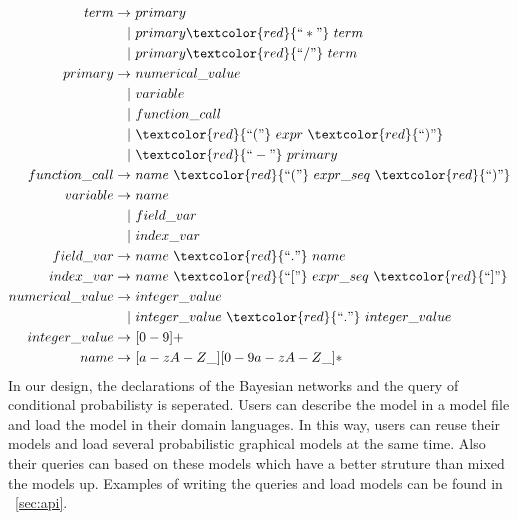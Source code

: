 \begin{align*}             
             term \rightarrow & ~primary \\  
                   |& ~primary \textcolor{red}{``*"} ~term \\
                   |& ~primary \textcolor{red}{``/"} ~term \\
          primary \rightarrow & ~numerical\_value \\
                   |& ~variable \\
                   |& ~function\_call \\
                   |& ~\textcolor{red}{``("} ~expr ~\textcolor{red}{``)"} \\
                   |& ~\textcolor{red}{``-"} ~primary \\           
    function\_call \rightarrow & ~name ~\textcolor{red}{``("} ~expr\_seq ~\textcolor{red}{``)"} \\           
         variable \rightarrow & ~name \\
                   |& ~field\_var \\
                   |& ~index\_var \\              
        field\_var \rightarrow & ~name ~\textcolor{red}{``."} ~name \\
        index\_var \rightarrow & ~name ~\textcolor{red}{``["} ~expr\_seq ~\textcolor{red}{``]"} \\           
  numerical\_value \rightarrow & ~integer\_value \\
                   |& ~integer\_value ~\textcolor{red}{``."} ~integer\_value \\                  
    integer\_value \rightarrow & ~[0-9]+ \\            
             name \rightarrow & ~[a-zA-Z\_][0-9a-zA-Z\_]*
\end{align*}
In our design, the declarations of the Bayesian networks and the query of conditional probabilisty is seperated. Users can describe the model in a model file and load the model in their domain languages. In this way, users can reuse their models and load several probabilistic graphical models at the same time. Also their queries can based on these models which have a better struture than mixed the models up. Examples of writing the queries and load models can be found in ~\ref{sec:api}.

